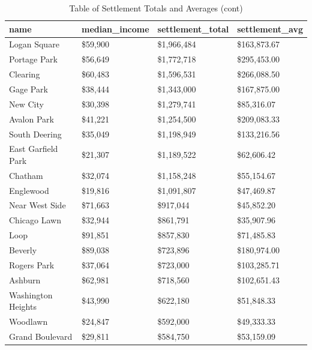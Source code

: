 \documentclass{article}
\begin{document}
\begin{table}[h!]
\centering
\caption{Table of Settlement Totals and Averages (cont)}
\label{table1}
\begin{tabular}{|l|l|l|l|}
\hline
name                   & median\_income & settlement\_total & settlement\_avg \\
\hline
Logan Square           & \$59,900       & \$1,966,484       & \$163,873.67    \\
Portage Park           & \$56,649       & \$1,772,718       & \$295,453.00    \\
Clearing               & \$60,483       & \$1,596,531       & \$266,088.50    \\
Gage Park              & \$38,444       & \$1,343,000       & \$167,875.00    \\
New City               & \$30,398       & \$1,279,741       & \$85,316.07     \\
Avalon Park            & \$41,221       & \$1,254,500       & \$209,083.33    \\
South Deering          & \$35,049       & \$1,198,949       & \$133,216.56    \\
East Garfield Park     & \$21,307       & \$1,189,522       & \$62,606.42     \\
Chatham                & \$32,074       & \$1,158,248       & \$55,154.67     \\
Englewood              & \$19,816       & \$1,091,807       & \$47,469.87     \\
Near West Side         & \$71,663       & \$917,044         & \$45,852.20     \\
Chicago Lawn           & \$32,944       & \$861,791         & \$35,907.96     \\
Loop                   & \$91,851       & \$857,830         & \$71,485.83     \\
Beverly                & \$89,038       & \$723,896         & \$180,974.00    \\
Rogers Park            & \$37,064       & \$723,000         & \$103,285.71    \\
Ashburn                & \$62,981       & \$718,560         & \$102,651.43    \\
Washington Heights     & \$43,990       & \$622,180         & \$51,848.33     \\
Woodlawn               & \$24,847       & \$592,000         & \$49,333.33     \\
Grand Boulevard        & \$29,811       & \$584,750         & \$53,159.09     \\

\end{tabular}
\end{table}
\end{document}
